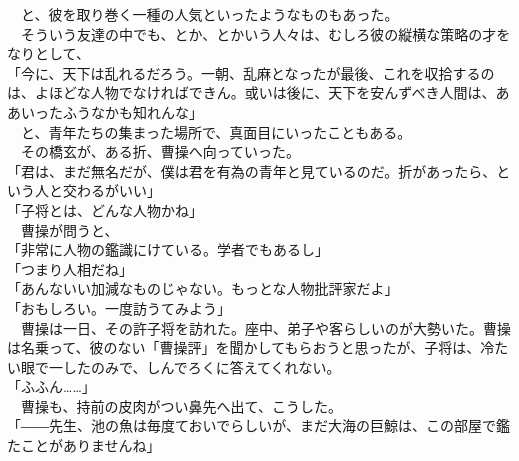 \documentclass[
  paper=a5,
  fontsize=10pt,
  jafontsize=9.5pt,
  tate,                  %
  open_bracket_pos=nibu, %
]{jlreq}
\begin{document}
　と、彼を取り巻く一種の人気といったようなものもあった。\\


　そういう友達の中でも、とか、とかいう人々は、むしろ彼の縦横な策略の才をなりとして、\\


「今に、天下は乱れるだろう。一朝、乱麻となったが最後、これを収拾するのは、よほどな人物でなければできん。或いは後に、天下を安んずべき人間は、ああいったふうなかも知れんな」\\


　と、青年たちの集まった場所で、真面目にいったこともある。\\


　その橋玄が、ある折、曹操へ向っていった。\\


「君は、まだ無名だが、僕は君を有為の青年と見ているのだ。折があったら、という人と交わるがいい」\\


「子将とは、どんな人物かね」\\


　曹操が問うと、\\


「非常に人物の鑑識にけている。学者でもあるし」\\


「つまり人相だね」\\


「あんないい加減なものじゃない。もっとな人物批評家だよ」\\


「おもしろい。一度訪うてみよう」\\


　曹操は一日、その許子将を訪れた。座中、弟子や客らしいのが大勢いた。曹操は名乗って、彼のない「曹操評」を聞かしてもらおうと思ったが、子将は、冷たい眼で一したのみで、しんでろくに答えてくれない。\\


「ふふん……」\\


　曹操も、持前の皮肉がつい鼻先へ出て、こうした。\\


「――先生、池の魚は毎度ておいでらしいが、まだ大海の巨鯨は、この部屋で鑑たことがありませんね」\\
\end{document}
